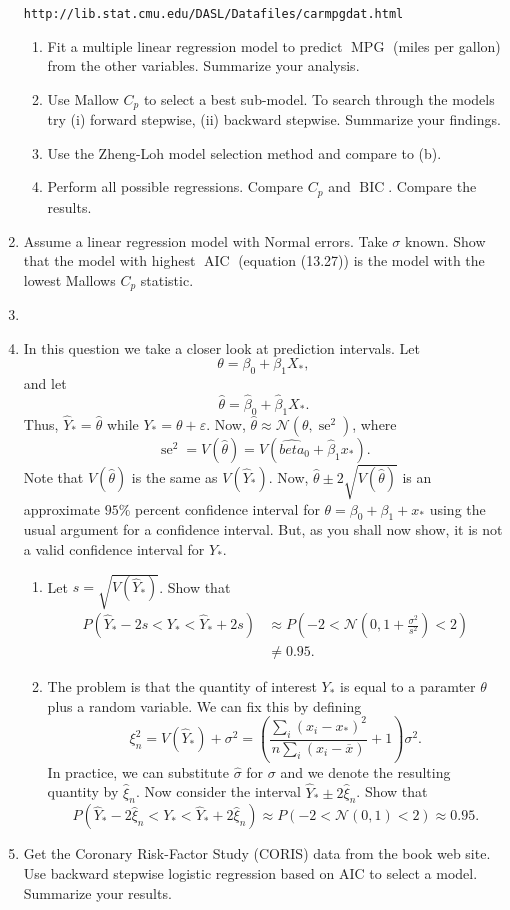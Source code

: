 \documentclass{article}
\newcommand{\se}{\operatorname{se}}
\begin{document}
\begin{enumerate}
	\texttt{http://lib.stat.cmu.edu/DASL/Datafiles/carmpgdat.html}
		\begin{enumerate}
			\item Fit a multiple linear regression model to predict $\operatorname{MPG}$ (miles per gallon) from the other variables. Summarize your analysis.
			\item Use Mallow $C_p$ to select a best sub-model. To search through the models try (i) forward stepwise, (ii) backward stepwise. Summarize your findings.
			\item Use the Zheng-Loh model selection method and compare to (b).
			\item Perform all possible regressions. Compare $C_p$ and $\operatorname{BIC}$. Compare the results.
		\end{enumerate}
	\item Assume a linear regression model with Normal errors. Take $\sigma$ known. Show that the model with highest $\operatorname{AIC}$ (equation (13.27)) is the model with the lowest Mallows $C_p$ statistic.
	\item 
	\item In this question we take a closer look at prediction intervals. Let
	$$
	\theta = \beta_0 + \beta_1 X_*,
	$$
	and let
	$$
	\hat{\theta} = \hat{\beta}_0 + \hat{\beta}_1 X_*.
	$$
	Thus, $\hat{Y}_* = \hat{\theta}$ while $Y_* = \theta + \varepsilon$. Now, $\hat{\theta} \approx \mathcal{N}(\theta, \se^2)$, where
	$$
	\se^2 = V(\hat{\theta}) = V(\hat{beta}_0 + \hat{\beta}_1 x_*).
	$$
	Note that $V(\hat{\theta})$ is the same as $V(\hat{Y}_*)$. Now, $\hat{\theta} \pm 2 \sqrt{V(\hat{\theta})}$ is an approximate $95\%$ percent confidence interval for $\theta = \beta_0 + \beta_1 + x_*$ using the usual argument for a confidence interval. But, as you shall now show, it is not a valid confidence interval for $Y_*$.
		\begin{enumerate}
			\item Let $s = \sqrt{V(\hat{Y}_*)}$. Show that
			$$
			\begin{aligned}
			P(\hat{Y}_* - 2s < Y_* < \hat{Y}_* + 2 s) &\approx P\left( -2 < \mathcal{N}\left(0, 1 + \frac{\sigma^2}{s^2}\right) < 2\right) \\
			&\neq 0.95.
			\end{aligned}
			$$
			\item The problem is that the quantity of interest $Y_*$ is equal to a paramter $\theta$ plus a random variable. We can fix this by defining
			$$
			\xi_n^2 = V(\hat{Y}_*) + \sigma^2 = \left(\frac{\sum_i (x_i - x_*)^2}{n \sum_i (x_i - \overline{x})} + 1\right)\sigma^2.
			$$
			In practice, we can substitute $\hat{\sigma}$ for $\sigma$ and we denote the resulting quantity by $\hat{\xi}_n$. Now consider the interval $\hat{Y}_* \pm 2 \hat{\xi}_n$. Show that
			$$
			P(\hat{Y}_* - 2\hat{\xi}_n < Y_* < \hat{Y}_* + 2 \hat{\xi}_n) \approx P(-2 < \mathcal{N}(0, 1) < 2) \approx 0.95.
			$$
		\end{enumerate}
	\item Get the Coronary Risk-Factor Study (CORIS) data from the book web site. Use backward stepwise logistic regression based on AIC to select a model. Summarize your results.
\end{enumerate}
\end{document}
